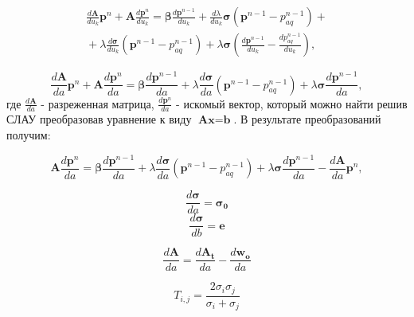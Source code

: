\documentclass[14pt]{article}
\begin{document}
\begin{eqnarray} \label{dFP_du}
\frac{d\boldsymbol{A}}{du_k}\boldsymbol{p}^n + \boldsymbol{A}\frac{d\boldsymbol{p}^n}{du_k} =
\boldsymbol{\beta}\frac{d\boldsymbol{p}^{n-1}}{du_k} + \frac{d\lambda}{du_k}\boldsymbol{\sigma}(\boldsymbol{p}^{n-1}-p_{aq}^{n-1})+ {} \nonumber\\
{} + 
\lambda\frac{d\boldsymbol{\sigma}}{du_k}(\boldsymbol{p}^{n-1}-p_{aq}^{n-1})+
\lambda\boldsymbol{\sigma}\left(\frac{d\boldsymbol{p}^{n-1}}{du_k}-\frac{dp_{aq}^{n-1}}{du_k}\right),
\end{eqnarray}

\begin{equation} \label{dFP_da}
\frac{d\boldsymbol{A}}{da}\boldsymbol{p}^n + \boldsymbol{A}\frac{d\boldsymbol{p}^n}{da} = \boldsymbol{\beta}\frac{d\boldsymbol{p}^{n-1}}{da} + \lambda\frac{d\boldsymbol{\sigma}}{da}(\boldsymbol{p}^{n-1}-p_{aq}^{n-1})+\lambda\boldsymbol{\sigma}\frac{d\boldsymbol{p}^{n-1}}{da},
\end{equation}
где $ \frac{d\boldsymbol{A}}{da} $ - разреженная матрица, $ \frac{d\boldsymbol{p}^n}{da} $ - искомый вектор, который можно найти решив СЛАУ преобразовав уравнение к виду $\textbf{A}\textbf{x}=\textbf{b}$. В результате преобразований получим:

\begin{equation} \label{rp}
\boldsymbol{A}\frac{d\boldsymbol{p}^n}{da} = \boldsymbol{\beta}\frac{d\boldsymbol{p}^{n-1}}{da} + \lambda\frac{d\boldsymbol{\sigma}}{da}(\boldsymbol{p}^{n-1}-p_{aq}^{n-1})+\lambda\boldsymbol{\sigma}\frac{d\boldsymbol{p}^{n-1}}{da}-\frac{d\boldsymbol{A}}{da}\boldsymbol{p}^n,
\end{equation}

\begin{equation*} \label{dsig_da}
\frac{d\boldsymbol{\sigma}}{da} = \boldsymbol{\sigma_0}
\end{equation*}
\begin{equation*} \label{dsig_db}
\frac{d\boldsymbol{\sigma}}{db} = \boldsymbol{e}
\end{equation*}

\begin{equation} \label{dA_da}
\frac{d\boldsymbol{A}}{da} = \frac{d\boldsymbol{A_t}}{da}-\frac{d\boldsymbol{w_o}}{da}
\end{equation}

\begin{equation} \label{Tij}
T_{i,j} = \frac{2{\sigma_i}{\sigma_j}}{{\sigma_i} + {\sigma_j}}
\end{equation}
\end{document}
